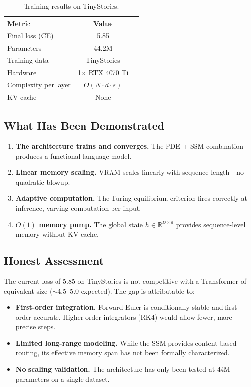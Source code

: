 \documentclass{article}
\newcommand{\R}{\mathbb{R}}
\begin{document}
\begin{table}[h]
\centering
\caption{Training results on TinyStories.}
\label{tab:results}
\begin{tabular}{lcc}
\toprule
\textbf{Metric} & \textbf{Value} \\
\midrule
Final loss (CE) & 5.85 \\
Parameters & 44.2M \\
Training data & TinyStories \\
Hardware & 1$\times$ RTX 4070 Ti \\
Complexity per layer & $O(N \cdot d \cdot s)$ \\
KV-cache & None \\
\bottomrule
\end{tabular}
\end{table}

\subsection{What Has Been Demonstrated}

\begin{enumerate}
    \item \textbf{The architecture trains and converges.} The PDE + SSM combination produces a functional language model.
    \item \textbf{Linear memory scaling.} VRAM scales linearly with sequence length---no quadratic blowup.
    \item \textbf{Adaptive computation.} The Turing equilibrium criterion fires correctly at inference, varying computation per input.
    \item \textbf{$O(1)$ memory pump.} The global state $h \in \R^{B \times d}$ provides sequence-level memory without KV-cache.
\end{enumerate}

\subsection{Honest Assessment}

The current loss of 5.85 on TinyStories is not competitive with a Transformer of equivalent size ($\sim$4.5--5.0 expected). The gap is attributable to:
\begin{itemize}
    \item \textbf{First-order integration.} Forward Euler is conditionally stable and first-order accurate. Higher-order integrators (RK4) would allow fewer, more precise steps.
    \item \textbf{Limited long-range modeling.} While the SSM provides content-based routing, its effective memory span has not been formally characterized.
    \item \textbf{No scaling validation.} The architecture has only been tested at 44M parameters on a single dataset.
\end{itemize}
\end{document}
